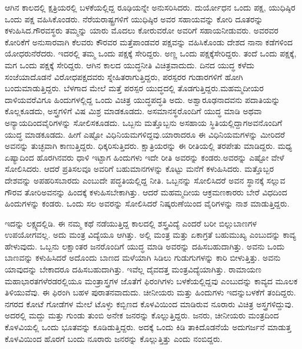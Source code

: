 ಆಗಿನ ಕಾಲದಲ್ಲಿ ಕ್ಷತ್ರಿಯರಲ್ಲಿ ಬಳಕೆಯಲ್ಲಿದ್ದ ರೂಢಿಯನ್ನೇ ಅನುಸರಿಸಿದರು. ದುರ್ಯೋಧನ ಒಂದು ಪಕ್ಷ, ಯುಧಿಷ್ಠಿರ ಒಂದು ಪಕ್ಷ ವಹಿಸಿಕೊಂಡರು. ನೆರೆಯ\break ರಾಷ್ಟ್ರಗಳಿಗೆ ಯುಧಿಷ್ಠಿರ ಅವರ ಸಹಾಯವನ್ನು ಕೋರಿ ದೂತರನ್ನು ಕಳುಹಿಸಿದ.\break ಗೌರವಸ್ಥರು ತಮ್ಮನ್ನು ಯಾರು ಮೊದಲು ಕೋರುವರೋ ಅವರಿಗೆ ಸಹಾಯ\break ನೀಡುವರು. ಅವರವರ ಕೋರಿಕೆಗೆ ಅನುಸಾರವಾಗಿ ಕೆಲವರು ಕೌರವರ ಮತ್ತೆ\break ಪಾಂಡವರ ಪಕ್ಷವನ್ನು ವಹಿಸಿಕೊಂಡು ದೇಶದ ನಾನಾ ಕಡೆಗಳಿಂದ ಯೋಧರು\break ನೆರೆದರು. ಇದರಲ್ಲಿ ತಮ್ಮ ಒಂದು ಪಕ್ಷಕ್ಕೆ ಸೇರಿದ್ದರು. ಅಣ್ಣ ಒಂದು ಪಕ್ಷಕ್ಕೆ\break ಸೇರಿದ್ದರು. ತಂದೆ ಒಂದು ಪಕ್ಷಕ್ಕೆ, ಮಗ ಒಂದು ಪಕ್ಷಕ್ಕೆ ಸೇರಿದ್ದರು. ಆಗಿನ ಕಾಲದ ಯುದ್ಧನೀತಿ ವಿಚಿತ್ರವಾದುದು. ದಿನದ ಯುದ್ಧ ಕಳೆದು ಸಂಜೆಯಾದೊಡನೆ ವಿರೋಧ\break ಪಕ್ಷದವರು ಸ್ನೇಹಿತರಾಗುತ್ತಿದ್ದರು, ಪರಸ್ಪರರ ಗುಡಾರಗಳಿಗೆ ಹೋಗಿ ಬಂದು\break ಮಾಡುತ್ತಿದ್ದರು. ಬೆಳಗಾದ ಮೇಲೆ ಮತ್ತೆ ಪರಸ್ಪರ ಯುದ್ಧದಲ್ಲಿ ತೊಡಗುತ್ತಿದ್ದರು.\break ಮಹಮ್ಮದೀಯರ ದಾಳಿಯವರೆವಿಗೂ ಹಿಂದುಗಳಲ್ಲಿದ್ದ ಒಂದು ವಿಚಿತ್ರ ಯುದ್ಧ\break ಪದ್ಧತಿ ಅದು. ಅಶ್ವಾರೂಢನಾದವನು ಪದಾತಿಯನ್ನು ಕೊಲ್ಲಕೂಡದು, ಅಸ್ತ್ರಗಳಿಗೆ ವಿಷ ಮಿಶ್ರ ಮಾಡಕೂಡದು. ಅಸಮಾನಸ್ಥರೊಂದಿಗೆ ಯುದ್ಧ ಮಾಡಿ ಅಥವಾ ಅನ್ಯಾಯದಿಂದ\break ವೈರಿಗಳನ್ನು ಸೋಲಿಸಕೂಡದು. ಒಬ್ಬನು ಮತ್ತೊಬ್ಬನು ಅಸಹಾಯ ಸ್ಥಿತಿಯಲ್ಲಿದ್ದಾಗ\break ಅವನೊಂದಿಗೆ ಯುದ್ಧ ಮಾಡಕೂಡದು. ಹೀಗೆ ಎಷ್ಟೋ ವಿಧಿನಿಯಮಗಳಿದ್ದವು.\break ಯಾರಾದರೂ ಈ ವಿಧಿನಿಯಮಗಳನ್ನು ಮೀರಿದರೆ ಅವನನ್ನು ತುಚ್ಛವಾಗಿ ಕಾಣುತ್ತಿದ್ದರು. ಧಿಕ್ಕರಿಸುತ್ತಿದರು. ಕ್ಷಾತ್ರಿಯರನ್ನು ಈ ರೀತಿಯಲ್ಲಿ ತರಪೇತು ಮಾಡಿದ್ದರು. ಮಧ್ಯ ಏಷ್ಯಾದಿಂದ ಹೊರಗಿನವರು ಧಾಳಿ ಇಟ್ಟಾಗ ಹಿಂದುಗಳು ಇದೇ ರೀತಿ ಅವರನ್ನು ಕಂಡರು.\break ಅವರನ್ನು ಎಷ್ಟೋ ವೇಳೆ ಸೋಲಿಸಿದರು. ಆದರೆ ಪ್ರತಿಸಲವೂ ಅವರಿಗೆ ಬಹುಮಾನಗಳನ್ನು ಕೊಟ್ಟು ಮನೆಗೆ ಕಳುಹಿಸಿದರು. ಮತ್ತೊಬ್ಬರ ದೇಶವನ್ನು ಅಪಹರಿಸಬಾರದು ಎಂಬುದೇ ಪದ್ಧತಿಯಲ್ಲಿದ್ದ ನೀತಿ. ಒಬ್ಬನನ್ನು ಸೋಲಿಸಿದರೆ ಅವನ ಸ್ಥಾನಕ್ಕೆ ಸಲ್ಲುವ ಗೌರವ ತೋರಿ\break ಅವನನ್ನು ಹಿಂದಕ್ಕೆ ಕಳುಹಿಸಬೇಕಾಗಿತ್ತು. ಆದರೆ ಮಹಮ್ಮದೀಯ ಆಕ್ರಮಣಕಾರರು ಬೇರೆ ವಿಧದಿಂದ ಹಿಂದುಗಳನ್ನು ಕಂಡರು. ಒಂದು ಸಲ ಅವರನ್ನು ಸೋಲಿಸಿದರೆ ನಿಷ್ಕರುಣೆಯಿಂದ ವೈರಿಗಳನ್ನು ನಾಶ ಮಾಡುತ್ತಿದ್ದರು.

\vskip 0.1cm

ಇದನ್ನು ಲಕ್ಷ್ಯದಲ್ಲಿಡಿ. ಈ ನಮ್ಮ ಕಥೆ ನಡೆಯುತ್ತಿದ್ದ ಕಾಲದಲ್ಲಿ ಶಸ್ತ್ರವಿದ್ಯೆ ಎಂದರೆ ಬರೀ ಬಿಲ್ಲುಬಾಣಗಳ ಉಪಯೋಗವಲ್ಲ. ಅದು ಮಂತ್ರ ವಿದ್ಯೆಯೂ ಆಗಿತ್ತು. ಅಲ್ಲಿ ಮಂತ್ರ ಮತ್ತು ಏಕಾಗ್ರತೆ ಬಹುಮುಖ್ಯ ಎಂಬುದನ್ನು ಕಾವ್ಯ ಹೇಳುವುದು. ಒಬ್ಬನು ಲಕ್ಷಾಂತರ ಜನರೊಂದಿಗೆ ಯುದ್ಧ ಮಾಡಿ ಅವರನ್ನು ದಹಿಸಬಹುದಾಗಿತ್ತು. ಅವನು ಒಂದು ಬಾಣವನ್ನು ಕಳುಹಿಸಿದರೆ ಅದೊಂದು ಬಾಣದ ಮಳೆಯಾಗಿ ಸಿಡಿಲು ಗುಡುಗುಗಳನ್ನು ಕಾರಿ ಬೀಳುತ್ತಿತ್ತು. ಅವನು ಯಾವುದನ್ನು ಬೇಕಾದರೂ ದಹಿಸಬಹುದಾಗಿತ್ತು. ಇವೆಲ್ಲ ದೈವದತ್ತ ಮಂತ್ರವಿದ್ಯೆಯಾಗಿತ್ತು. ರಾಮಾಯಣ ಮಹಾಭಾರತಗಳೆರಡರಲ್ಲಿಯೂ ಮಂತ್ರಾಸ್ತ್ರಗಳ ಜೊತೆಗೆ ಫಿರಂಗಿಗಳು ಬಳಕೆಯಲ್ಲಿದ್ದವು ಎಂಬುದನ್ನು ಕಾವ್ಯದ ಮೂಲಕ ತಿಳಿಯುವೆವು. ಈ ಫಿರಂಗಿ ಬಹಳ ಪುರಾತನವಾದುದು. ಚೀನೀಯರು ಮತ್ತು ಹಿಂದುಗಳು ಇದನ್ನು\break ಬಳಕೆಗೆ ತಂದಿದ್ದರು. ನಗರದ ಕೋಟೆ ಗೋಡೆಗಳ ಮೇಲೆ ಟೊಳ್ಳು ಕಬ್ಬಿಣದ ಕೊಳವಿಯಿಂದ ಮಾಡಿರುವ ನೂರಾರು ವಿಚಿತ್ರ ಅಸ್ತ್ರಗಳಿದ್ದುವು. ಅದರಲ್ಲಿ ಮದ್ದು ಮತ್ತು ಗುಂಡು ತುಂಬಿ ಅನೇಕ ಜನರನ್ನು ಕೊಲ್ಲುತ್ತಿದ್ದರು. ಜನರು, ಚೀನೀಯರು ಮಂತ್ರದಿಂದ ಕೊಳವಿಯಲ್ಲಿ ಒಂದು ಭೂತವನ್ನು ಕೂಡಿಡುತ್ತಿದ್ದರು. ಅದಕ್ಕೆ ಒಂದು ಕಿಡಿ ತಾಕಿದೊಡನೆಯೆ ಅದು\break ಗರ್ಜನೆ ಮಾಡುತ್ತ ಕೊಳವಿಯಿಂದ ಹೊರಗೆ ಬಂದು ನೂರಾರು ಜನರನ್ನು ಕೊಲ್ಲುತ್ತಿತ್ತು ಎಂದು ನಂಬಿದ್ದರು.

